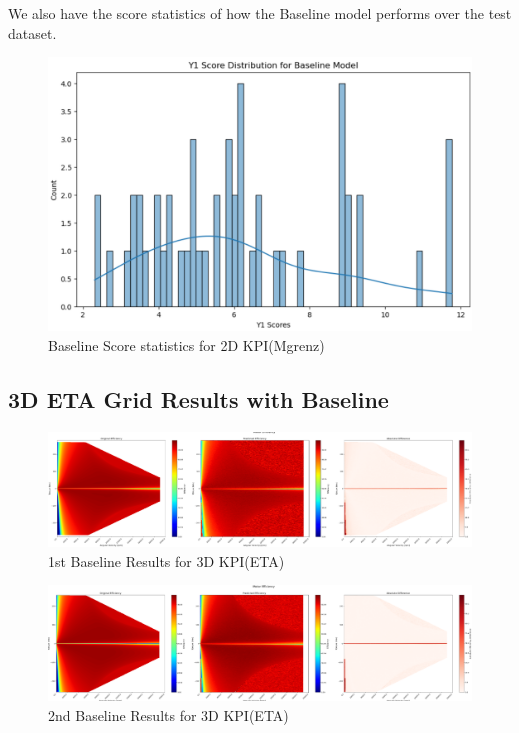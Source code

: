 \documentclass{report} %
\begin{document}
We also have the score statistics of how the Baseline model performs over the test dataset.\\

\begin{figure}[H]
    \centering
    \includegraphics[width=1\textwidth]{./ReportImages/score_baseline_y1.png} 
    \caption{Baseline Score statistics for 2D KPI(Mgrenz)} 
    \label{fig:Baseline Score statistics for 2D KPI(Mgrenz)}
\end{figure}

\subsection{3D ETA Grid Results with Baseline}\label{sec:3D ETA Grid Results with Baseline}

\begin{figure}[H]
    \centering
    \includegraphics[width=1\textwidth]{./ReportImages/KPI3Dprediction3.png} 
    \caption{1st Baseline Results for 3D KPI(ETA)} 
    \label{fig:1st MLP Training Results for 3D KPI(ETA)}
\end{figure}

\begin{figure}[H]
    \centering
    \includegraphics[width=1\textwidth]{./ReportImages/KPI3Dprediction4.png} 
    \caption{2nd Baseline Results for 3D KPI(ETA)} 
    \label{fig:2nd MLP Training Results for 3D KPI(ETA)}
\end{figure}
\end{document}
